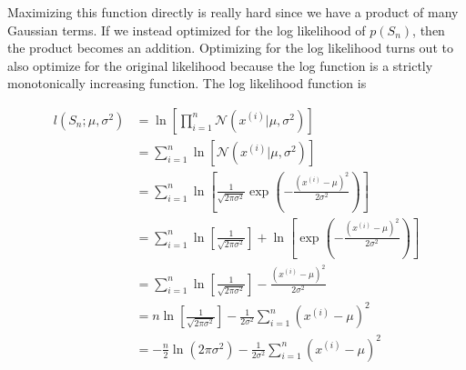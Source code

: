 \documentclass[12pt]{article}
\begin{document}
Maximizing this function directly is really hard since we have a product of many Gaussian terms. If we instead optimized for the log likelihood of $p(S_n)$, then the product becomes an addition. Optimizing for the log likelihood turns out to also optimize for the original likelihood because the log function is a strictly monotonically increasing function. The log likelihood function is 

\[ 
	\begin{aligned}
		l(S_n; \mu, \sigma^2) &= \ln \left[ \prod_{i=1}^n \mathcal{N}(x^{(i)}| \mu, \sigma^2) \right]\\
													&= \sum_{i=1}^n \ln \left[ \mathcal{N}(x^{(i)}| \mu, \sigma^2) \right]\\
													&= \sum_{i=1}^n \ln \left[ \frac 1 {\sqrt{2 \pi \sigma^2}} \exp \left(- \frac {(x^{(i)} - \mu)^2} {2 \sigma^2}\right) \right]\\
													&= \sum_{i=1}^n \ln \left[ \frac 1 {\sqrt{2 \pi \sigma^2}} \right] + \ln \left[ \exp \left(- \frac {(x^{(i)} - \mu)^2} {2 \sigma^2}\right) \right]\\
													&= \sum_{i=1}^n \ln \left[ \frac 1 {\sqrt{2 \pi \sigma^2}} \right] - \frac {(x^{(i)} - \mu)^2} {2 \sigma^2}\\
													&= n\ln \left[ \frac 1 {\sqrt{2 \pi \sigma^2}} \right] - \frac 1 {2 \sigma^2} \sum_{i=1}^n (x^{(i)} - \mu)^2\\
													&= -\frac n 2 \ln (2 \pi \sigma^2) - \frac 1 {2 \sigma^2} \sum_{i=1}^n (x^{(i)} - \mu)^2\\
	\end{aligned}
\]
\end{document}
